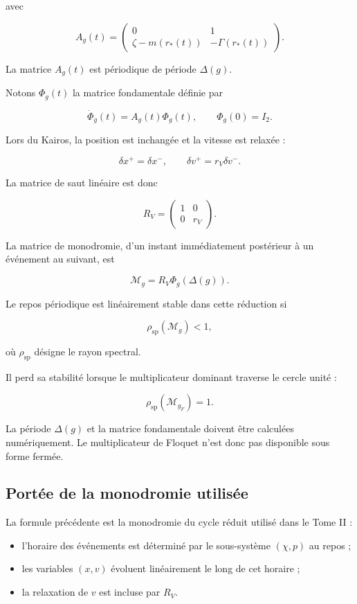 avec

\[
\boxed{
A_g(t)
=
\begin{pmatrix}
0&1\\
\zeta-m(r_\ast(t))
&
-\Gamma(r_\ast(t))
\end{pmatrix}.
}
\]

La matrice \(A_g(t)\) est périodique de période \(\Delta(g)\).

Notons \(\Phi_g(t)\) la matrice fondamentale définie par

\[
\dot\Phi_g(t)
=
A_g(t)\Phi_g(t),
\qquad
\Phi_g(0)=I_2.
\]

Lors du Kairos, la position est inchangée et la vitesse est relaxée :

\[
\delta x^+=\delta x^-,
\qquad
\delta v^+=r_V\delta v^-.
\]

La matrice de saut linéaire est donc

\[
R_V
=
\begin{pmatrix}
1&0\\
0&r_V
\end{pmatrix}.
\]

La matrice de monodromie, d'un instant immédiatement postérieur à un
événement au suivant, est

\[
\boxed{
\mathcal M_g
=
R_V\Phi_g(\Delta(g)).
}
\]

Le repos périodique est linéairement stable dans cette réduction si

\[
\rho_{\mathrm{sp}}(\mathcal M_g)<1,
\]

où \(\rho_{\mathrm{sp}}\) désigne le rayon spectral.

Il perd sa stabilité lorsque le multiplicateur dominant traverse le
cercle unité :

\[
\boxed{
\rho_{\mathrm{sp}}(\mathcal M_{g_F})=1.
}
\]

La période \(\Delta(g)\) et la matrice fondamentale doivent être
calculées numériquement. Le multiplicateur de Floquet n'est donc pas
disponible sous forme fermée.

\subsection{Portée de la monodromie utilisée}
\label{annexe-r2-portee-monodromie}

La formule précédente est la monodromie du cycle réduit utilisé dans
le Tome II :

\begin{itemize}
\item
  l'horaire des événements est déterminé par le sous-système
  \((\chi,p)\) au repos ;
\item
  les variables \((x,v)\) évoluent linéairement le long de cet horaire ;
\item
  la relaxation de \(v\) est incluse par \(R_V\).
\end{itemize}

